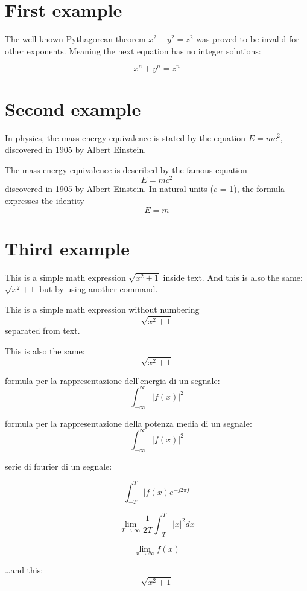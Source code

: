 \documentclass{article}
\begin{document}
\section{First example}

The well known Pythagorean theorem \(x^2 + y^2 = z^2\) was
proved to be invalid for other exponents.
Meaning the next equation has no integer solutions:

\[ x^n + y^n = z^n \]



\section{Second example}

In physics, the mass-energy equivalence is stated by the equation $E=mc^2$, discovered in 1905 by Albert Einstein.

The mass-energy equivalence is described by the famous equation
$$E=mc^2$$
discovered in 1905 by Albert Einstein.
In natural units ($c$ = 1), the formula expresses the identity
\begin{equation}
E=m
\end{equation}

\section{Third example}

This is a simple math expression \(\sqrt{x^2+1}\) inside text.
And this is also the same:
\begin{math}
\sqrt{x^2+1}
\end{math}
but by using another command.

This is a simple math expression without numbering
\[\sqrt{x^2+1}\]
separated from text.

This is also the same:
\begin{displaymath}
\sqrt{x^2+1}
\end{displaymath}


formula per la rappresentazione dell'energia di un segnale:
$$\int_{-\infty}^{\infty} |f(x)|^2$$

formula per la rappresentazione della potenza media di un segnale:
$$\int_{-\infty}^{\infty} |f(x)|^2$$

serie di fourier di un segnale:

$$\int_{-T}^{T} |f(x) e^{-j2\pi f}$$


$$\lim_{T\to\infty} \frac{1}{2T} \int_{-T}^{T} |x|^2 dx$$

$$\lim_{x\to\infty} f(x)$$

\ldots and this:
\begin{equation*}
\sqrt{x^2+1}
\end{equation*}
\end{document}
